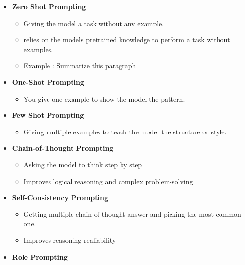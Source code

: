 \documentclass[10pt,a4paper]{article}
\begin{document}
\begin{itemize}

\item
  \textbf{Zero Shot Prompting}

  \begin{itemize}
  
  \item
    Giving the model a task without any example.
  \item
    relies on the model\textquotesingle s pretrained knowledge to perform a task without examples.
  \item
    Example : \textquotesingle Summarize this paragraph\textquotesingle{}
  \end{itemize}
\item
  \textbf{One-Shot Prompting}

  \begin{itemize}
  
  \item
    You give one example to show the model the pattern.
  \end{itemize}
\item
  \textbf{Few Shot Prompting}

  \begin{itemize}
  
  \item
    Giving multiple examples to teach the model the structure or style.
  \end{itemize}
\item
  \textbf{Chain-of-Thought Prompting}

  \begin{itemize}
  
  \item
    Asking the model to think step by step
  \item
    Improves logical reasoning and complex problem-solving
  \end{itemize}
\item
  \textbf{Self-Consistency Prompting}

  \begin{itemize}
  
  \item
    Getting multiple chain-of-thought answer and picking the most common one.
  \item
    Improves reasoning realiability
  \end{itemize}
\item
  \textbf{Role Prompting}

  \begin{itemize}
  

\end{itemize}
\end{itemize}
\end{document}
